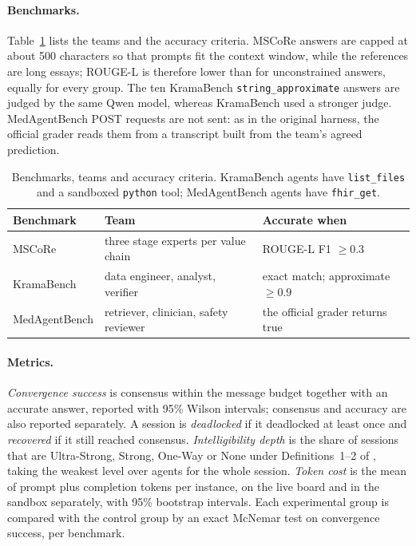 \documentclass[11pt]{article}
\begin{document}
\paragraph{Benchmarks.} Table~\ref{tab:benchmarks} lists the teams and the accuracy criteria.
MSCoRe answers are capped at about 500 characters so that prompts fit the context window, while
the references are long essays; ROUGE-L is therefore lower than for unconstrained answers, equally
for every group. The ten KramaBench \texttt{string\_approximate} answers are judged by the same
Qwen model, whereas KramaBench used a stronger judge. MedAgentBench POST requests are not sent:
as in the original harness, the official grader reads them from a transcript built from the
team's agreed prediction.

\begin{table}[h]
\centering\small
\begin{tabular}{lll}
\toprule
Benchmark & Team & Accurate when \\
\midrule
MSCoRe & three stage experts per value chain & ROUGE-L F1 $\geq 0.3$ \\
KramaBench & data engineer, analyst, verifier & exact match; approximate $\geq 0.9$ \\
MedAgentBench & retriever, clinician, safety reviewer & the official grader returns true \\
\bottomrule
\end{tabular}
\caption{Benchmarks, teams and accuracy criteria. KramaBench agents have \texttt{list\_files}
and a sandboxed \texttt{python} tool; MedAgentBench agents have \texttt{fhir\_get}.}
\label{tab:benchmarks}
\end{table}

\paragraph{Metrics.} \emph{Convergence success} is consensus within the message budget together
with an accurate answer, reported with 95\% Wilson intervals; consensus and accuracy are also
reported separately. A session is \emph{deadlocked} if it deadlocked at least once and
\emph{recovered} if it still reached consensus. \emph{Intelligibility depth} is the share of
sessions that are Ultra-Strong, Strong, One-Way or None under Definitions~1--2 of
\citet{mestha2025}, taking the weakest level over agents for the whole session. \emph{Token cost}
is the mean of prompt plus completion tokens per instance, on the live board and in the sandbox
separately, with 95\% bootstrap intervals. Each experimental group is compared with the control
group by an exact McNemar test on convergence success, per benchmark.
\end{document}
